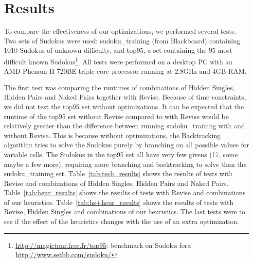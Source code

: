 \documentclass[11pt]{article} %
\begin{document}
\section{Results}

To compare the effectiveness of our optimizations, we performed several tests. Two sets of Sudokus were used: sudoku\_training (from Blackboard) containing 1010 Sudokus of unknown difficulty, and top95, a set containing the 95 most difficult known Sudokus\footnote{\url{http://magictour.free.fr/top95}: benchmark on Sudoku fora \url{http://www.setbb.com/sudoku/}}. All tests were performed on a desktop PC with an AMD Phenom II 720BE triple core processor running at 2.8GHz and 4GB RAM.

The first test was comparing the runtimes of combinations of Hidden Singles, Hidden Pairs and Naked Pairs together with Revise. Because of time constraints, we did not test the top95 set without optimizations. It can be expected that the runtime of the top95 set without Revise compared to with Revise would be relatively greater than the difference between running sudoku\_training with and without Revise. This is because without optimizations, the Backtracking algorithm tries to solve the Sudokus purely by branching on all possible values for variable cells. The Sudokus in the top95 set all have very few givens (17, some maybe a few more), requiring more branching and backtracking to solve than the sudoku\_training set.
Table~\ref{tab:tech_results} shows the results of tests with Revise and combinations of Hidden Singles, Hidden Pairs and Naked Pairs. Table~\ref{tab:heur_results} shows the results of tests with Revise and combinations of our heuristics. Table~\ref{tab:hs+heur_results} shows the results of tests with Revise, Hidden Singles and combinations of our heuristics. The last tests were to see if the effect of the heuristics changes with the use of an extra optimization.
\end{document}
